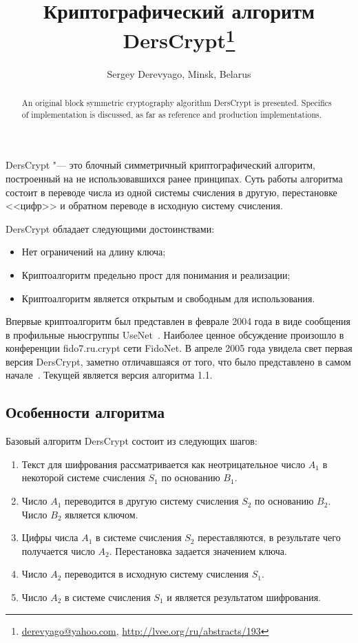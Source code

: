 \documentclass[10pt, a5paper]{article}
\begin{document}
\title{Криптографический алгоритм DersCrypt\footnote{\url{derevyago@yahoo.com}, \url{http://lvee.org/ru/abstracts/193}}}
\author{Sergey Derevyago, Minsk, Belarus}
\maketitle
\begin{abstract}
An original block symmetric cryptography algorithm DersCrypt is presented. Specifics of implementation is discussed, as far as reference and production implementations.
\end{abstract}
DersCrypt "--- это блочный симметричный криптографический алгоритм, построенный на не использовавшихся ранее принципах. Суть работы алгоритма состоит в переводе числа из одной системы счисления в другую, перестановке <<цифр>> и обратном переводе в исходную систему счисления.

DersCrypt обладает следующими достоинствами:

\begin{itemize}
  \item Нет ограничений на длину ключа;
  \item Криптоалгоритм предельно прост для понимания и реализации;
  \item Криптоалгоритм является открытым и свободным для использования.
\end{itemize}

Впервые криптоалгоритм был представлен в феврале 2004 года в виде сообщения в профильные ньюсгруппы UseNet~\cite{Derevyago1}. Наиболее ценное обсуждение произошло в конференции fido7.ru.crypt сети FidoNet. В апреле 2005 года увидела свет первая версия DersCrypt, заметно отличавшаяся от того, что было представлено в самом начале~\cite{Derevyago2}. Текущей является версия алгоритма 1.1.

\subsection*{Особенности алгоритма}

Базовый алгоритм DersCrypt состоит из следующих шагов:

\begin{enumerate}
  \item Текст для шифрования рассматривается как неотрицательное число $A_{1}$ в некоторой системе счисления $S_{1}$ по основанию $B_{1}$.
  \item Число $A_{1}$ переводится в другую систему счисления $S_{2}$ по основанию $B_{2}$. Число $B_{2}$ является ключом.
  \item Цифры числа $A_{1}$ в системе счисления $S_{2}$ переставляются, в результате чего получается число $A_{2}$. Перестановка задается значением ключа.
  \item Число $A_{2}$ переводится в исходную систему счисления $S_{1}$.
  \item Число $A_{2}$ в системе счисления $S_{1}$ и является результатом шифрования.
\end{enumerate}
\end{document}
